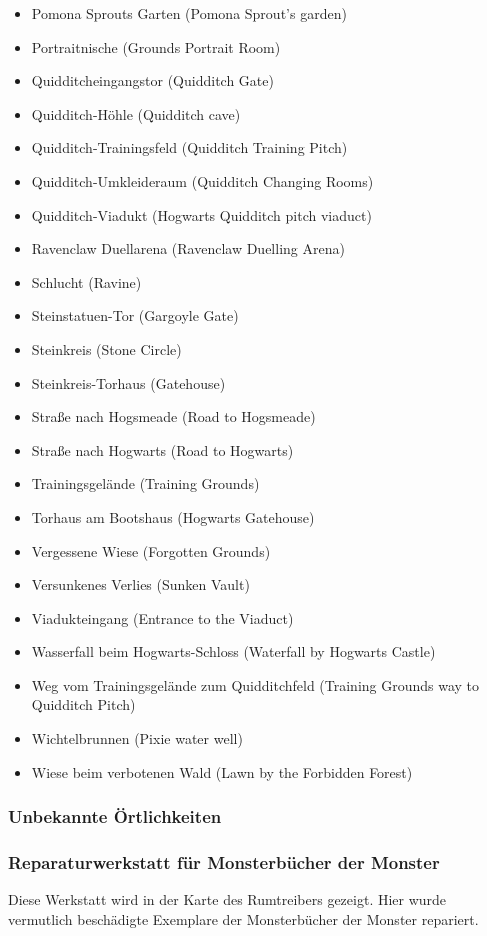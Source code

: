 \documentclass[a4paper, 10pt]{article}
\begin{document}
\begin{itemize}
    \item Pomona Sprouts Garten (Pomona Sprout's garden)
    \item Portraitnische (Grounds Portrait Room)
    \item Quidditcheingangstor (Quidditch Gate)
    \item Quidditch-Höhle (Quidditch cave)
    \item Quidditch-Trainingsfeld (Quidditch Training Pitch)
    \item Quidditch-Umkleideraum (Quidditch Changing Rooms)
    \item Quidditch-Viadukt (Hogwarts Quidditch pitch viaduct)
    \item Ravenclaw Duellarena (Ravenclaw Duelling Arena)
    \item Schlucht (Ravine)
    \item Steinstatuen-Tor (Gargoyle Gate)
    \item Steinkreis (Stone Circle)
    \item Steinkreis-Torhaus (Gatehouse)
    \item Straße nach Hogsmeade (Road to Hogsmeade)
    \item Straße nach Hogwarts (Road to Hogwarts)
    \item Trainingsgelände (Training Grounds)
    \item Torhaus am Bootshaus (Hogwarts Gatehouse)
    \item Vergessene Wiese (Forgotten Grounds)
    \item Versunkenes Verlies (Sunken Vault)
    \item Viadukteingang (Entrance to the Viaduct)
    \item Wasserfall beim Hogwarts-Schloss (Waterfall by Hogwarts Castle)
    \item Weg vom Trainingsgelände zum Quidditchfeld (Training Grounds way to Quidditch Pitch)
    \item Wichtelbrunnen (Pixie water well)
    \item Wiese beim verbotenen Wald (Lawn by the Forbidden Forest)
\end{itemize}

\subsubsection*{\Large Unbekannte Örtlichkeiten}
\subsubsection*{\large Reparaturwerkstatt für Monsterbücher der Monster}
Diese Werkstatt wird in der Karte des Rumtreibers gezeigt. Hier wurde vermutlich beschädigte Exemplare der Monsterbücher der Monster repariert.
\end{document}

